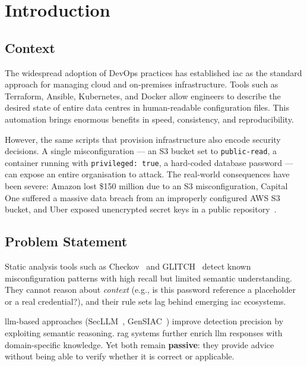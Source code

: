 \documentclass[12pt, a4paper]{report}
\begin{document}
\tableofcontents
\listoffigures
\listoftables

\printglossary[type=\acronymtype, title=List of Acronyms]

\chapter{Introduction}

\section{Context}

The widespread adoption of DevOps practices has established \gls{iac} as the standard
approach for managing cloud and on-premises infrastructure. Tools such as Terraform,
Ansible, Kubernetes, and Docker allow engineers to describe the desired state of entire
data centres in human-readable configuration files. This automation brings enormous
benefits in speed, consistency, and reproducibility.

However, the same scripts that provision infrastructure also encode security decisions.
A single misconfiguration --- an S3 bucket set to \texttt{public-read}, a container
running with \texttt{privileged: true}, a hard-coded database password --- can expose
an entire organisation to attack. The real-world consequences have been severe: Amazon
lost \$150 million due to an S3 misconfiguration, Capital One suffered a massive data
breach from an improperly configured AWS S3 bucket, and Uber exposed unencrypted secret
keys in a public repository~\citep{war2025detection}.

\section{Problem Statement}

Static analysis tools such as Checkov~\citep{checkov2024} and GLITCH~\citep{saavedra2022glitch}
detect known misconfiguration patterns with high recall but limited semantic understanding.
They cannot reason about \emph{context} (e.g., is this password reference a placeholder or
a real credential?), and their rule sets lag behind emerging \gls{iac} ecosystems.

\gls{llm}-based approaches (SecLLM~\citep{devito2025secllm}, GenSIAC~\citep{li2025gensiac})
improve detection precision by exploiting semantic reasoning. \gls{rag} systems
\citep{yao2024crag, asai2023selfrag} further enrich \gls{llm} responses with domain-specific
knowledge. Yet both remain \textbf{passive}: they provide advice without being able to
verify whether it is correct or applicable.
\end{document}
